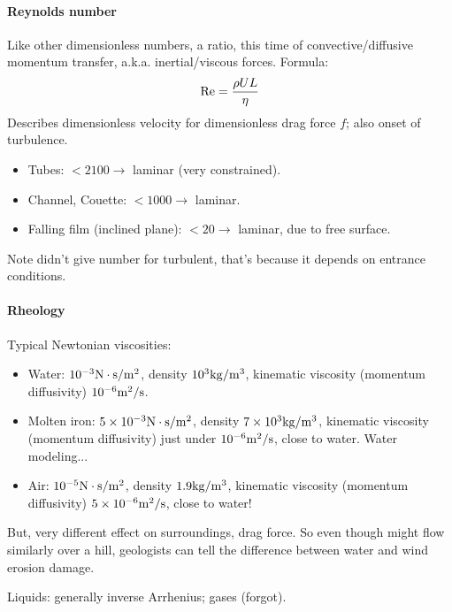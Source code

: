 \documentclass{report}
\begin{document}
\paragraph{Reynolds number}

Like other dimensionless numbers, a ratio, this time of convective/diffusive
momentum transfer, a.k.a. inertial/viscous forces.  Formula:
$${\rm Re}=\frac{\rho UL}{\eta}$$
Describes dimensionless velocity for dimensionless drag force $f$; also onset
of turbulence.
\begin{itemize}
\item Tubes: $<2100\rightarrow$ laminar (very constrained).
\item Channel, Couette: $<1000\rightarrow$ laminar.
\item Falling film (inclined plane): $<20\rightarrow$ laminar, due to free
  surface.
\end{itemize}
Note didn't give number for turbulent, that's because it depends on entrance
conditions.

\paragraph{Rheology}

Typical Newtonian viscosities:
\begin{itemize}
\item Water: $\rm10^{-3}N\cdot s/m^2$, density $\rm10^3kg/m^3$, kinematic
  viscosity (momentum diffusivity) $\rm10^{-6}m^2/s$.
\item Molten iron: $\rm5\times10^{-3}N\cdot s/m^2$, density
  $\rm7\times10^3kg/m^3$, kinematic viscosity (momentum diffusivity) just under
  $\rm10^{-6}m^2/s$, close to water.  Water modeling...
\item Air: $\rm10^{-5}N\cdot s/m^2$, density $\rm1.9kg/m^3$, kinematic
  viscosity (momentum diffusivity) $\rm5\times10^{-6}m^2/s$, close to water!
\end{itemize}
But, very different effect on surroundings, drag force.  So even though might
flow similarly over a hill, geologists can tell the difference between water
and wind erosion damage.

Liquids: generally inverse Arrhenius; gases (forgot).
\end{document}

